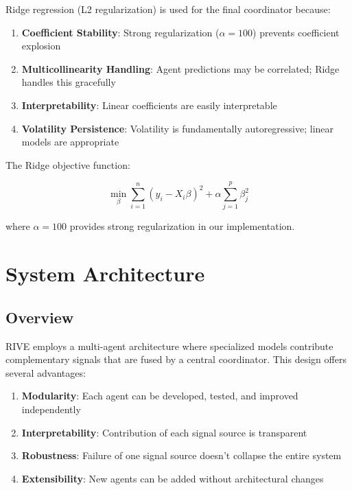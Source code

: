 \documentclass[12pt,a4paper]{article}
\begin{document}
Ridge regression (L2 regularization) is used for the final coordinator because:

\begin{enumerate}
    \item \textbf{Coefficient Stability}: Strong regularization ($\alpha = 100$) prevents coefficient explosion
    \item \textbf{Multicollinearity Handling}: Agent predictions may be correlated; Ridge handles this gracefully
    \item \textbf{Interpretability}: Linear coefficients are easily interpretable
    \item \textbf{Volatility Persistence}: Volatility is fundamentally autoregressive; linear models are appropriate
\end{enumerate}

The Ridge objective function:

\begin{equation}
    \min_{\beta} \sum_{i=1}^{n} (y_i - X_i\beta)^2 + \alpha \sum_{j=1}^{p} \beta_j^2
\end{equation}

where $\alpha = 100$ provides strong regularization in our implementation.

\section{System Architecture}

\subsection{Overview}

RIVE employs a multi-agent architecture where specialized models contribute complementary signals that are fused by a central coordinator. This design offers several advantages:

\begin{enumerate}
    \item \textbf{Modularity}: Each agent can be developed, tested, and improved independently
    \item \textbf{Interpretability}: Contribution of each signal source is transparent
    \item \textbf{Robustness}: Failure of one signal source doesn't collapse the entire system
    \item \textbf{Extensibility}: New agents can be added without architectural changes
\end{enumerate}
\end{document}
